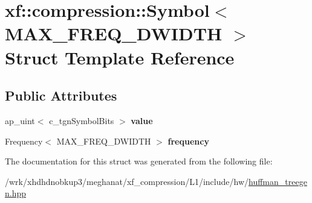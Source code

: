 \hypertarget{structxf_1_1compression_1_1Symbol}{\section{xf\-:\-:compression\-:\-:Symbol$<$ M\-A\-X\-\_\-\-F\-R\-E\-Q\-\_\-\-D\-W\-I\-D\-T\-H $>$ Struct Template Reference}
\label{structxf_1_1compression_1_1Symbol}
}
\subsection*{Public Attributes}
\begin{DoxyCompactItemize}
\item 
\hypertarget{structxf_1_1compression_1_1Symbol_a41bc0c88e89fbfcd4099e8b920507fa5}{ap\-\_\-uint$<$ c\-\_\-tgn\-Symbol\-Bits $>$ {\bfseries value}}\label{structxf_1_1compression_1_1Symbol_a41bc0c88e89fbfcd4099e8b920507fa5}

\item 
\hypertarget{structxf_1_1compression_1_1Symbol_aeb018d1da0c8310cfb123aacccc4953d}{Frequency$<$ M\-A\-X\-\_\-\-F\-R\-E\-Q\-\_\-\-D\-W\-I\-D\-T\-H $>$ {\bfseries frequency}}\label{structxf_1_1compression_1_1Symbol_aeb018d1da0c8310cfb123aacccc4953d}

\end{DoxyCompactItemize}


The documentation for this struct was generated from the following file\-:\begin{DoxyCompactItemize}
\item 
/wrk/xhdhdnobkup3/meghanat/xf\-\_\-compression/\-L1/include/hw/\hyperlink{huffman__treegen_8hpp}{huffman\-\_\-treegen.\-hpp}\end{DoxyCompactItemize}
